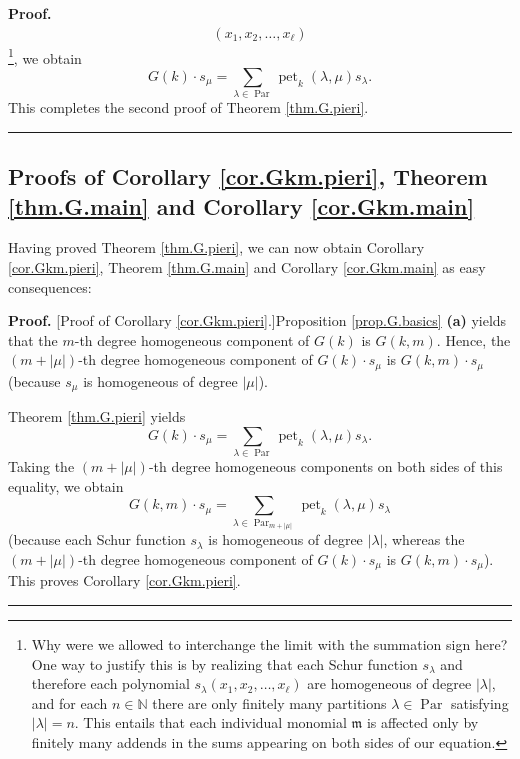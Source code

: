 \documentclass[numbers=enddot,12pt,final,onecolumn,notitlepage]{scrartcl}%
\theoremstyle{definition}
\newenvironment{proof}[1][Proof]{\noindent\textbf{#1.} }{\ \rule{0.5em}{0.5em}}
\let\sumnonlimits\sum
\renewcommand{\sum}{\sumnonlimits\limits}
\newenvironment{verlong}{}{}
\newenvironment{vershort}{}{}
\begin{document}
\begin{verlong}
\begin{proof}
\begin{align*}
{}\left(  x_{1},x_{2},\ldots,x_{\ell}\right)
\end{align*}
\footnote{Why were we allowed to interchange the limit with the summation sign
here? One way to justify this is by realizing that each Schur function
$s_{\lambda}$ and therefore each polynomial $s_{\lambda}\left(  x_{1}%
,x_{2},\ldots,x_{\ell}\right)  $ are homogeneous of degree $\left\vert
\lambda\right\vert $, and for each $n\in\mathbb{N}$ there are only finitely
many partitions $\lambda\in\operatorname*{Par}$ satisfying $\left\vert
\lambda\right\vert =n$. This entails that each individual monomial
$\mathfrak{m}$ is affected only by finitely many addends in the sums appearing
on both sides of our equation.}, we obtain%
\[
G\left(  k\right)  \cdot s_{\mu}=\sum_{\lambda\in\operatorname*{Par}%
}\operatorname*{pet}\nolimits_{k}\left(  \lambda,\mu\right)  s_{\lambda}.
\]
This completes the second proof of Theorem \ref{thm.G.pieri}.
\end{proof}
\end{verlong}

\subsection{\label{subsect.proofs.G.cors}Proofs of Corollary
\ref{cor.Gkm.pieri}, Theorem \ref{thm.G.main} and Corollary \ref{cor.Gkm.main}%
}

Having proved Theorem \ref{thm.G.pieri}, we can now obtain Corollary
\ref{cor.Gkm.pieri}, Theorem \ref{thm.G.main} and Corollary \ref{cor.Gkm.main}
as easy consequences:

\begin{vershort}
\begin{proof}
[Proof of Corollary \ref{cor.Gkm.pieri}.]Proposition \ref{prop.G.basics}
\textbf{(a)} yields that the $m$-th degree homogeneous component of $G\left(
k\right)  $ is $G\left(  k,m\right)  $. Hence, the $\left(  m+\left\vert
\mu\right\vert \right)  $-th degree homogeneous component of $G\left(
k\right)  \cdot s_{\mu}$ is $G\left(  k,m\right)  \cdot s_{\mu}$ (because
$s_{\mu}$ is homogeneous of degree $\left\vert \mu\right\vert $).

Theorem \ref{thm.G.pieri} yields%
\[
G\left(  k\right)  \cdot s_{\mu}=\sum_{\lambda\in\operatorname*{Par}%
}\operatorname*{pet}\nolimits_{k}\left(  \lambda,\mu\right)  s_{\lambda}.
\]
Taking the $\left(  m+\left\vert \mu\right\vert \right)  $-th degree
homogeneous components on both sides of this equality, we obtain%
\[
G\left(  k,m\right)  \cdot s_{\mu}=\sum_{\lambda\in\operatorname*{Par}%
\nolimits_{m+\left\vert \mu\right\vert }}\operatorname*{pet}\nolimits_{k}%
\left(  \lambda,\mu\right)  s_{\lambda}%
\]
(because each Schur function $s_{\lambda}$ is homogeneous of degree
$\left\vert \lambda\right\vert $, whereas the $\left(  m+\left\vert
\mu\right\vert \right)  $-th degree homogeneous component of $G\left(
k\right)  \cdot s_{\mu}$ is $G\left(  k,m\right)  \cdot s_{\mu}$). This proves
Corollary \ref{cor.Gkm.pieri}.
\end{proof}
\end{vershort}
\end{document}
